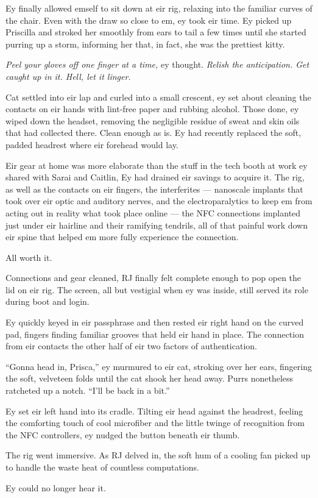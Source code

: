 Ey finally allowed emself to sit down at eir rig, relaxing into the familiar curves of the chair. Even with the draw so close to em, ey took eir time. Ey picked up Priscilla and stroked her smoothly from ears to tail a few times until she started purring up a storm, informing her that, in fact, she was the prettiest kitty.

\emph{Peel your gloves off one finger at a time,} ey thought. \emph{Relish the anticipation. Get caught up in it. Hell, let it linger.}

Cat settled into eir lap and curled into a small crescent, ey set about cleaning the contacts on eir hands with lint-free paper and rubbing alcohol. Those done, ey wiped down the headset, removing the negligible residue of sweat and skin oils that had collected there. Clean enough as is. Ey had recently replaced the soft, padded headrest where eir forehead would lay.

Eir gear at home was more elaborate than the stuff in the tech booth at work ey shared with Sarai and Caitlin, Ey had drained eir savings to acquire it. The rig, as well as the contacts on eir fingers, the interferites — nanoscale implants that took over eir optic and auditory nerves, and the electroparalytics to keep em from acting out in reality what took place online — the NFC connections implanted just under eir hairline and their ramifying tendrils, all of that painful work down eir spine that helped em more fully experience the connection.

All worth it.

Connections and gear cleaned, RJ finally felt complete enough to pop open the lid on eir rig. The screen, all but vestigial when ey was inside, still served its role during boot and login.

Ey quickly keyed in eir passphrase and then rested eir right hand on the curved pad, fingers finding familiar grooves that held eir hand in place. The connection from eir contacts the other half of eir two factors of authentication.

``Gonna head in, Prisca,'' ey murmured to eir cat, stroking over her ears, fingering the soft, velveteen folds until the cat shook her head away. Purrs nonetheless ratcheted up a notch. ``I'll be back in a bit.''

Ey set eir left hand into its cradle. Tilting eir head against the headrest, feeling the comforting touch of cool microfiber and the little twinge of recognition from the NFC controllers, ey nudged the button beneath eir thumb.

The rig went immersive. As RJ delved in, the soft hum of a cooling fan picked up to handle the waste heat of countless computations.

Ey could no longer hear it.
